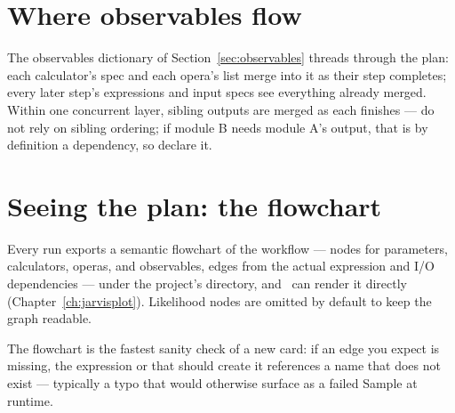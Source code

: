 \section{Where observables flow}
\label{sec:observable-flow}

The observables dictionary of Section~\ref{sec:observables} threads through the plan:
each calculator's  spec and each opera's  list merge into
it as their step completes; every later step's expressions and input specs see everything
already merged. Within one concurrent layer, sibling outputs are merged as each finishes
--- do not rely on sibling ordering; if module B needs module A's output, that is by
definition a dependency, so declare it.

\section{Seeing the plan: the flowchart}
\label{sec:flowchart}

Every run exports a semantic flowchart of the workflow --- nodes for parameters,
calculators, operas, and observables, edges from the actual expression and I/O
dependencies --- under the project's  directory, and \JPlot\ can
render it directly (Chapter~\ref{ch:jarvisplot}). Likelihood nodes are omitted by
default to keep the graph readable.

\begin{jtip}
The flowchart is the fastest sanity check of a new card: if an edge you expect is
missing, the expression or  that should create it references a name that
does not exist --- typically a typo that would otherwise surface as a failed Sample at
runtime.
\end{jtip}
